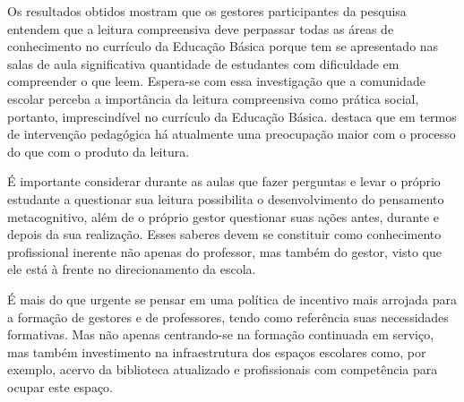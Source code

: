 \begin{refsection}
    Os resultados obtidos mostram que os gestores participantes da pesquisa entendem que a leitura compreensiva deve perpassar todas as áreas de conhecimento no currículo da Educação Básica porque tem se apresentado nas salas de aula significativa quantidade de estudantes com dificuldade em compreender o que leem. Espera-se com essa investigação que a comunidade escolar perceba a importância da leitura compreensiva como prática social, portanto, imprescindível no currículo da Educação Básica. \textcite{Leffa1996Fatores} destaca que em termos de intervenção pedagógica há atualmente uma preocupação maior com o processo do que com o produto da leitura.  

    É importante considerar durante as aulas que fazer perguntas e levar o próprio estudante a questionar sua leitura possibilita o desenvolvimento do pensamento metacognitivo, além de o próprio gestor questionar suas ações antes, durante e depois da sua realização. Esses saberes devem se constituir como conhecimento profissional inerente não apenas do professor, mas também do gestor, visto que ele está à frente no direcionamento da escola. 

    É mais do que urgente se pensar em uma política de incentivo mais arrojada para a formação de gestores e de professores, tendo como referência suas necessidades formativas. Mas não apenas centrando-se na formação continuada em serviço, mas também investimento na infraestrutura dos espaços escolares como, por exemplo, acervo da biblioteca atualizado e profissionais com competência para ocupar este espaço.

    \printbibliography[heading=subbibliography,notcategory=fullcited]

    \nocite{Flores2004Ensino}
    \nocite{RamalhoEtAl2003Ler}

    \label{chap:olhargestaoend}

\end{refsection}
